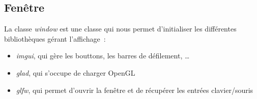 \subsection{Fenêtre}
La classe \textit{window} est une classe qui nous permet d'initialiser les
différentes bibliothèques gérant l'affichage~:
\begin{itemize}
    \item \textit{imgui}, qui gère les bouttons, les barres de défilement, …
    \item \textit{glad}, qui s'occupe de charger OpenGL
    \item \textit{glfw}, qui permet d'ouvrir la fenêtre et de récupérer les
        entrées clavier/souris
\end{itemize}


